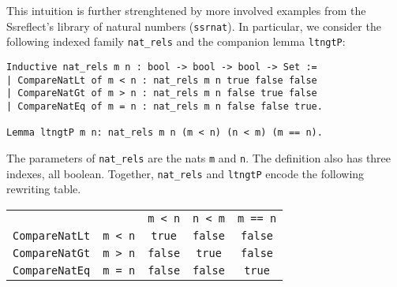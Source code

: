 \documentclass[blockstyle,preprint]{sigplanconf}
\newcommand{\code}[1]{\lstinline{#1}}
\begin{document}
This intuition is further strenghtened by more involved examples from
the Ssreflect's library of natural numbers (\code{ssrnat}). In
particular, we consider the following indexed family \code{nat_rels}
and the companion lemma \code{ltngtP}:

\begin{lstlisting}
Inductive nat_rels m n : bool -> bool -> bool -> Set :=
| CompareNatLt of m < n : nat_rels m n true false false
| CompareNatGt of m > n : nat_rels m n false true false
| CompareNatEq of m = n : nat_rels m n false false true.

Lemma ltngtP m n: nat_rels m n (m < n) (n < m) (m == n).
\end{lstlisting}

\noindent
The parameters of \code{nat_rels} are the nats \code{m} and
\code{n}. The definition also has three indexes, all boolean.
Together, \code{nat_rels} and \code{ltngtP} encode the following
rewriting table.

\vspace{5pt}

\begin{center}
\hspace{-20pt}
  \begin{tabular}{r|r|c|c|c|}
    \cline{3-5}
    \multicolumn{2}{c|}{} & \code{m < n} & \code{n < m} & \code{m == n}
    \\
    \cline{2-5}
    \multicolumn{1}{r}{\code{CompareNatLt}}& \multicolumn{1}{|c||}{\code{m < n}} & \code{true} & \code{false} & \code{false}
    \\
    \cline{2-5}
    \multicolumn{1}{r}{\code{CompareNatGt}}& \multicolumn{1}{|c||}{\code{m > n}} & \code{false} & \code{true} & \code{false}
    \\
    \cline{2-5}
    \multicolumn{1}{r}{\code{CompareNatEq}}& \multicolumn{1}{|c||}{\code{m = n}} & \code{false} & \code{false} & \code{true}
    \\
    \cline{2-5}
  \end{tabular}
\end{center}
\end{document}
